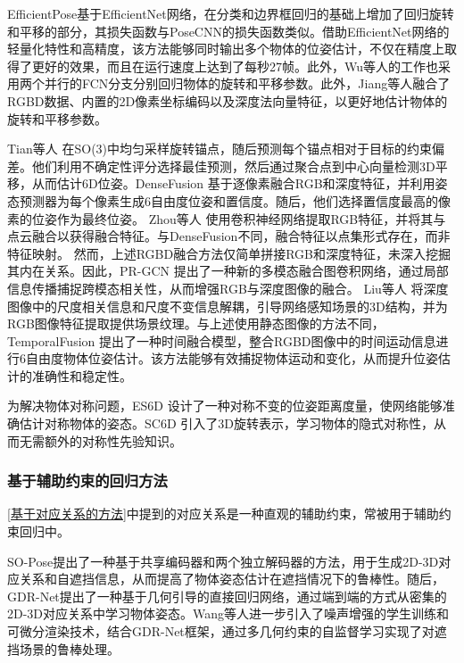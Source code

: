 \par EfficientPose\cite{bukschat2020efficientpose}基于EfficientNet网络\cite{koonce2021efficientnet}，在分类和边界框回归的基础上增加了回归旋转和平移的部分，其损失函数与PoseCNN的损失函数类似。借助EfficientNet网络的轻量化特性和高精度，该方法能够同时输出多个物体的位姿估计，不仅在精度上取得了更好的效果，而且在运行速度上达到了每秒27帧。此外，Wu等人的工作\cite{wu2018real}也采用两个并行的FCN\cite{FCN}分支分别回归物体的旋转和平移参数。此外，Jiang等人\cite{jiang2022uni6d}融合了RGBD数据、内置的2D像素坐标编码以及深度法向量特征，以更好地估计物体的旋转和平移参数。

\par Tian等人\cite{tian2020robust} 在SO(3)中均匀采样旋转锚点，随后预测每个锚点相对于目标的约束偏差。他们利用不确定性评分选择最佳预测，然后通过聚合点到中心向量检测3D平移，从而估计6D位姿。DenseFusion\cite{wang2019densefusion} 基于逐像素融合RGB和深度特征，并利用姿态预测器为每个像素生成6自由度位姿和置信度。随后，他们选择置信度最高的像素的位姿作为最终位姿。
Zhou等人\cite{zhou2020novel} 使用卷积神经网络提取RGB特征，并将其与点云融合以获得融合特征。与DenseFusion\cite{wang2019densefusion}不同，融合特征以点集形式存在，而非特征映射。
然而，上述RGBD融合方法仅简单拼接RGB和深度特征，未深入挖掘其内在关系。因此，PR-GCN\cite{Zhou2021PRGCNAD} 提出了一种新的多模态融合图卷积网络，通过局部信息传播捕捉跨模态相关性，从而增强RGB与深度图像的融合。
Liu等人\cite{liu2023depth} 将深度图像中的尺度相关信息和尺度不变信息解耦，引导网络感知场景的3D结构，并为RGB图像特征提取提供场景纹理。与上述使用静态图像的方法不同，TemporalFusion\cite{mu2021temporalfusion} 提出了一种时间融合模型，整合RGBD图像中的时间运动信息进行6自由度物体位姿估计。该方法能够有效捕捉物体运动和变化，从而提升位姿估计的准确性和稳定性。

\par 为解决物体对称问题，ES6D\cite{mo2022es6d} 设计了一种对称不变的位姿距离度量，使网络能够准确估计对称物体的姿态。SC6D\cite{cai2022sc6d} 引入了3D旋转表示，学习物体的隐式对称性，从而无需额外的对称性先验知识。

\subsubsection{基于辅助约束的回归方法}\label{基于辅助约束的回归方法}

\par \autoref{基于对应关系的方法}中提到的对应关系是一种直观的辅助约束，常被用于辅助约束回归中。

\par SO-Pose\cite{di2021so}提出了一种基于共享编码器和两个独立解码器的方法，用于生成2D-3D对应关系和自遮挡信息，从而提高了物体姿态估计在遮挡情况下的鲁棒性。随后，GDR-Net\cite{wang2021gdr}提出了一种基于几何引导的直接回归网络，通过端到端的方式从密集的2D-3D对应关系中学习物体姿态。Wang等人\cite{wang2021occlusion}进一步引入了噪声增强的学生训练和可微分渲染技术，结合GDR-Net框架\cite{wang2021gdr}，通过多几何约束的自监督学习实现了对遮挡场景的鲁棒处理。

